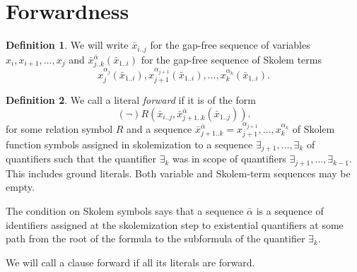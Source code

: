 \documentclass[english, shortabstract]{iithesis}
\theoremstyle{definition} \newtheorem{definition}{Definition}[chapter]
\theoremstyle{remark} \newtheorem{remark}[definition]{Observation}
\theoremstyle{plain} \newtheorem{theorem}[definition]{Theorem}
\theoremstyle{plain} \newtheorem{lemma}[definition]{Lemma}
\begin{document}
\section{Forwardness}

\begin{definition}\label{def:notation}
We will write $\bar{x}_{i..j}$ for the gap-free sequence of variables $x_i, x_{i+1}, \dots, x_j$ and 
$\bar{x}^{\bar{\alpha}}_{j..k}(\bar{x}_{1..i})$ for the gap-free sequence of Skolem terms
$$x^{\alpha_{j}}_{j}(\bar{x}_{1..i}), x^{\alpha_{j+1}}_{j+1}(\bar{x}_{1..i}), \dots, x^{\alpha_k}_k(\bar{x}_{1..i}).$$
\end{definition}

\begin{definition}\label{def:forward}
We call a literal \emph{forward} if it is of the form
$$(\lnot)R(\bar{x}_{i..j}, \bar{x}^{\bar{\alpha}}_{{j+1..k}}(\bar{x}_{1..j})).$$
for some relation symbol $R$
and a sequence $\bar{x}^{\bar{\alpha}}_{{j+1..k}}=x^{\alpha_{j+1}}_{j+1}, \dots, x^{\alpha_{k}}_{k}$ of 
Skolem function symbols assigned in skolemization to a sequence $\exists_{j+1}, \dots, \exists_{k}$ of quantifiers 
such that the quantifier $\exists_{k}$ was in scope of quantifiers $\exists_{j+1}, \dots, \exists_{k-1}$.
This includes ground literals. Both variable and Skolem-term sequences may be empty.
\end{definition}

The condition on Skolem symbols says that a sequence $\bar{\alpha}$ is a
sequence of identifiers assigned at the skolemization step to existential quantifiers
at some path from the root of the formula to the subformula of the quantifier $\exists_k$.

We will call a clause forward if all its literals are forward.
\end{document}
